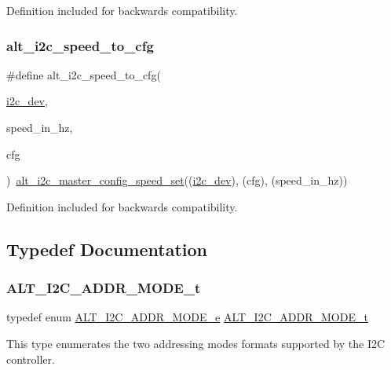 Definition included for backwards compatibility. \mbox{\label{group__ALT__I2C_ga00ab3f8d3299c796d4c3624db67e4f79}} 
\subsubsection{\texorpdfstring{alt\_i2c\_speed\_to\_cfg}{alt\_i2c\_speed\_to\_cfg}}
{\footnotesize\ttfamily \#define alt\+\_\+i2c\+\_\+speed\+\_\+to\+\_\+cfg(\begin{DoxyParamCaption}\item[{}]{\mbox{\hyperlink{structi2c__dev}{i2c\+\_\+dev}},  }\item[{}]{speed\+\_\+in\+\_\+hz,  }\item[{}]{cfg }\end{DoxyParamCaption})~\mbox{\hyperlink{group__ALT__I2C_gab7a9d3d9d126cce421b7a9e0254b2a6e}{alt\+\_\+i2c\+\_\+master\+\_\+config\+\_\+speed\+\_\+set}}((\mbox{\hyperlink{structi2c__dev}{i2c\+\_\+dev}}), (cfg), (speed\+\_\+in\+\_\+hz))}

Definition included for backwards compatibility. 

\subsection{Typedef Documentation}
\mbox{\label{group__ALT__I2C_gacaf56449440abffe69a7941f24f9bf5b}} 
\subsubsection{\texorpdfstring{ALT\_I2C\_ADDR\_MODE\_t}{ALT\_I2C\_ADDR\_MODE\_t}}
{\footnotesize\ttfamily typedef enum \mbox{\hyperlink{group__ALT__I2C_ga9f24389b4997825c99f8e6f8846be810}{A\+L\+T\+\_\+\+I2\+C\+\_\+\+A\+D\+D\+R\+\_\+\+M\+O\+D\+E\+\_\+e}}  \mbox{\hyperlink{group__ALT__I2C_gacaf56449440abffe69a7941f24f9bf5b}{A\+L\+T\+\_\+\+I2\+C\+\_\+\+A\+D\+D\+R\+\_\+\+M\+O\+D\+E\+\_\+t}}}

This type enumerates the two addressing modes formats supported by the I2C controller.

